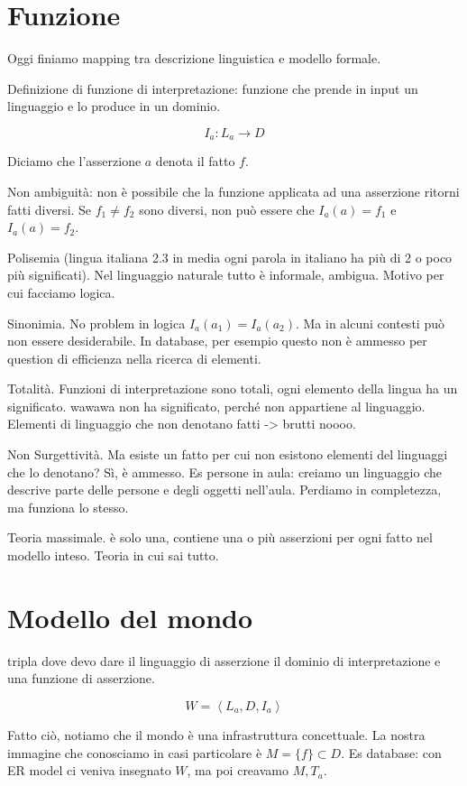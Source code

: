\marginpar{\minitoc}


\section{Funzione}
Oggi finiamo mapping tra descrizione linguistica
e modello formale.


Definizione di funzione di interpretazione:
funzione che prende in input un linguaggio e lo
produce in un dominio.

\[ I_a: L_a \to D \]

Diciamo che l'asserzione $a$ denota il fatto $f$.


Non ambiguità: non è possibile che la funzione applicata
ad una asserzione ritorni fatti diversi. Se $f_1 \not = f_2$
sono diversi, non può essere che $I_a(a) = f_1$ e $I_a(a) = f_2$.

Polisemia (lingua italiana 2.3 in media ogni parola in italiano
ha più di 2 o poco più significati). Nel linguaggio naturale
tutto è informale, ambigua. Motivo per cui facciamo logica.

Sinonimia. No problem in logica $I_a(a_1) = I_a(a_2)$. Ma in
alcuni contesti può non essere desiderabile. In database, per esempio
questo non è ammesso per question di efficienza nella ricerca
di elementi.

Totalità. Funzioni di interpretazione sono totali, ogni elemento
della lingua ha un significato. wawawa non ha significato, perché
non appartiene al linguaggio. Elementi di linguaggio che non
denotano fatti -> brutti noooo.

Non Surgettività. Ma esiste un fatto per cui non esistono elementi del linguaggi
che lo denotano? Sì, è ammesso. Es persone in aula: creiamo
un linguaggio che descrive parte delle persone e degli oggetti
nell'aula. Perdiamo in completezza, ma funziona lo stesso.

Teoria massimale. è solo una, contiene una o più asserzioni per ogni fatto
nel modello inteso. Teoria in cui sai tutto.


\section{Modello del mondo}
tripla dove devo dare il linguaggio di asserzione il dominio di interpretazione
e una funzione di asserzione.

\[ W = \left\langle L_a, D, I_a \right\rangle  \]

Fatto ciò, notiamo che il mondo è una infrastruttura concettuale. La nostra
immagine che conosciamo in casi particolare è $M = \{f\} \subset D$.
Es database: con ER model ci veniva insegnato $W$, ma poi creavamo $M, T_a$.


